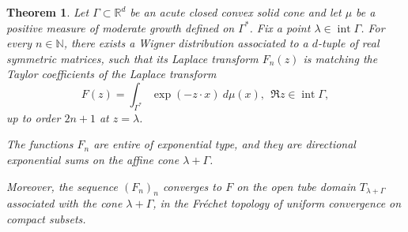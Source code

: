 \documentclass[10pt,a4paper]{amsart}
\newtheorem{theorem}{Theorem}
\begin{document}
	\begin{theorem}\label{th:Lap conv}
		Let $\Gamma \subset {\mathbb R}^d$ be an acute closed convex solid cone and let $\mu$ be a positive measure of moderate growth defined on $\Gamma^\ast$.
		Fix a point $\lambda \in \operatorname{int} \Gamma$. For every $n \in \mathbb{N}$, there exists a Wigner distribution associated 
		to a $d$-tuple of real symmetric matrices, such that its Laplace transform $F_n(z)$ is matching the Taylor coefficients of
		the Laplace transform
		$$ F(z) = \int_{\Gamma^\ast} \exp{(-z\cdot x)}\ d\mu(x), \ \ \Re z \in \operatorname{int} \Gamma,$$ 
        up to order $2n+1$ at $z = \lambda$. 
        
		The functions $F_n$ are entire of exponential type, and they are directional exponential sums on the affine cone $\lambda+\Gamma$. 
        
        Moreover, the sequence $(F_n)_n$ converges to $F$ on the open tube domain $T_{\lambda + \Gamma}$ associated with the cone $\lambda + \Gamma$, in the Fr\'echet topology of uniform convergence on compact subsets.
	\end{theorem}
\end{document}
